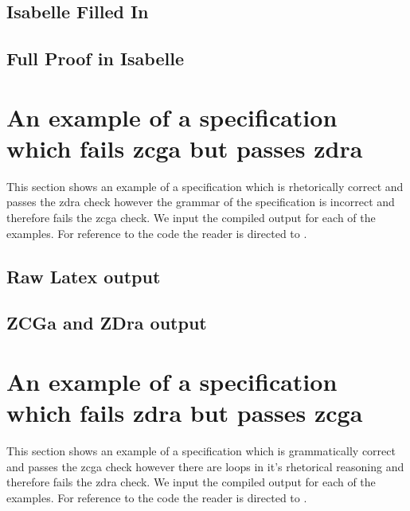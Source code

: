 \subsection{Isabelle Filled In}
\label{app:bb5}

\subsection{Full Proof in Isabelle}
\label{app:bb6}


\section{An example of a specification which fails \gls{zcga} but passes \gls{zdra}}
This section shows an example of a specification which is rhetorically correct and passes the \gls{zdra} check however the grammar of the specification is incorrect and therefore fails the \gls{zcga} check. We input the compiled output for each of the examples. For reference to the code the reader is directed to \cite{mathlangexamples}.

%
\subsection{Raw Latex output}

%
\subsection{ZCGa and ZDra output}


\section{An example of a specification which fails \gls{zdra} but passes \gls{zcga}}
This section shows an example of a specification which is grammatically correct and passes the \gls{zcga} check however there are loops in it's rhetorical reasoning and therefore fails the \gls{zdra} check. We input the compiled output for each of the examples. For reference to the code the reader is directed to \cite{mathlangexamples}.

